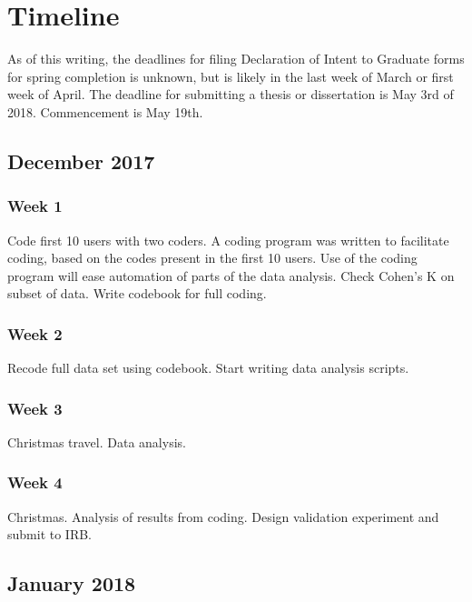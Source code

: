 \chapter{Timeline}

As of this writing, the deadlines for filing Declaration of Intent to Graduate forms for spring completion is unknown, but is likely in the last week of March or first week of April. 
The deadline for submitting a thesis or dissertation is May 3rd of 2018. 
Commencement is May 19th. 

\section{December 2017}

\subsection{Week 1}

Code first 10 users with two coders. A coding program was written to facilitate coding, based on the codes present in the first 10 users. Use of the coding program will ease automation of parts of the data analysis. 
Check Cohen's K on subset of data.
Write codebook for full coding. 

\subsection{Week 2}

Recode full data set using codebook.
Start writing data analysis scripts.

\subsection{Week 3}

Christmas travel. 
Data analysis.

\subsection{Week 4}

Christmas. 
Analysis of results from coding.
Design validation experiment and submit to IRB.

\section{January 2018}


